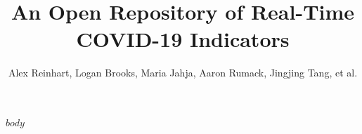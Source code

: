 \documentclass[9pt,twoside,lineno]{pnas-new}
\title{An Open Repository of Real-Time COVID-19 Indicators}
\author{Alex Reinhart, Logan Brooks, Maria Jahja, Aaron Rumack, Jingjing Tang,
  et al.}
\begin{document}
$body$







\end{document}
